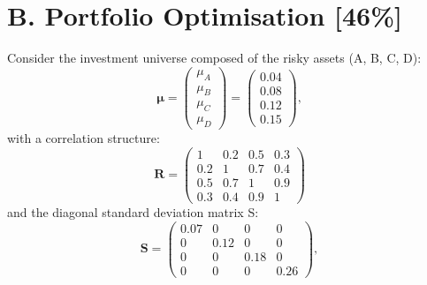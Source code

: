 \documentclass[11pt,oneside,a4paper, titlepage]{article}
\begin{document}
\section*{B. Portfolio Optimisation [46\%]}
Consider the investment universe composed of the risky assets (A, B, C, D):
\begin{displaymath}
\mathbf{\mu} =
\left( \begin{array}{c}
\mu_A\\
\mu_B\\
\mu_C\\
\mu_D
\end{array} \right)=
\left( \begin{array}{c}
0.04\\
0.08\\
0.12\\
0.15
\end{array} \right),
\end{displaymath}
with a correlation structure:
\begin{displaymath}
\mathbf{R} =
\left( \begin{array}{cccc}
1 & 0.2 & 0.5 & 0.3 \\
0.2 & 1 & 0.7 & 0.4 \\
0.5 & 0.7 & 1 & 0.9 \\
0.3 & 0.4 & 0.9 & 1
\end{array} \right)
\end{displaymath}
and the diagonal standard deviation matrix S:
\begin{displaymath}
\mathbf{S} =
\left( \begin{array}{cccc}
0.07 & 0 & 0 & 0 \\
0 & 0.12 & 0 & 0 \\
0 & 0 & 0.18 & 0 \\
0 & 0 & 0 & 0.26
\end{array} \right),
\end{displaymath}
\end{document}
